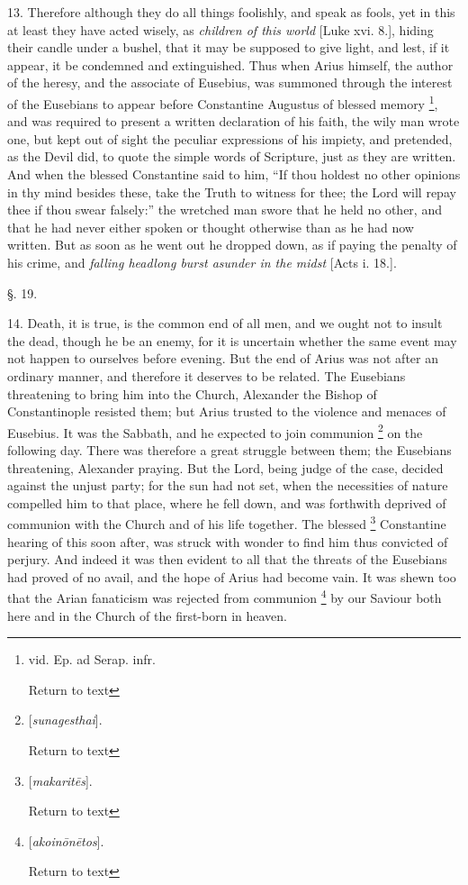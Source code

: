 13. Therefore although they do all things
foolishly, and speak as fools, yet in this at least they have acted
wisely, as \emph{children of this world} [Luke xvi. 8.], hiding their
candle under a bushel, that it may be supposed to give light, and
lest, if it appear, it be condemned and extinguished. Thus when Arius
himself, the author of the heresy, and the associate of Eusebius, was
summoned through the interest of the Eusebians to appear before
Constantine Augustus of blessed memory \footnote{vid. Ep. ad Serap. infr.

Return to text}, and was required to present a written declaration of his faith,
the wily man wrote one, but kept out of sight the peculiar expressions
of his impiety, and pretended, as the Devil did, to quote the simple
words of Scripture, just as they are written. And when the blessed
Constantine said to him, ``If thou holdest no other opinions in thy
mind besides these, take the Truth to witness for thee; the Lord will
repay thee if thou swear falsely:'' the wretched man swore that he held
no other, and that he had never either spoken or thought otherwise
than as he had now written. But as soon as he went out he dropped
down, as if paying the penalty of his crime, and \emph{falling headlong
burst asunder in the midst} [Acts i. 18.].

§. 19.

14. Death, it is true, is the common end of all
men, and we ought not to insult the dead, though he be an enemy, for
it is uncertain whether the same event may not happen to ourselves
before evening. But the end of Arius was not after an ordinary manner,
and therefore it deserves to be related. The Eusebians threatening to
bring him into the Church, Alexander the Bishop of Constantinople
resisted them; but Arius trusted to the violence and menaces of
Eusebius. It was the Sabbath, and he expected to join communion \footnote{[\emph{sunagesthai}].

Return to text} on the following day. There was therefore a great struggle
between them; the Eusebians threatening, Alexander praying. But the
Lord, being judge of the case, decided against the unjust party; for
the sun had not set, when the necessities of nature compelled him to
that place, where he fell down, and was forthwith deprived of
communion with the Church and of his life together. The blessed \footnote{[\emph{makarit\={e}s}].

Return to text} Constantine hearing of this soon after, was struck with wonder to
find him thus convicted of perjury. And indeed it was then evident to
all that the threats of the Eusebians had proved of no avail, and the
hope of Arius had become vain. It was shewn too that the Arian
fanaticism was rejected from communion \footnote{[\emph{akoin\={o}n\={e}tos}].

Return to text} by our Saviour both here and in the Church of the first-born in
heaven.

